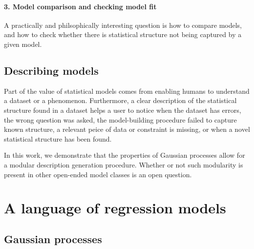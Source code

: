 \documentclass[letterpaper]{article}
\begin{document}
\paragraph{3. Model comparison and checking model fit}
A practically and philsophically interesting question is how to compare models, and how to check whether there is statistical structure not being captured by a given model. 



\subsection{Describing models}

Part of the value of statistical models comes from enabling humans to understand a dataset or a phenomenon.
Furthermore, a clear description of the statistical structure found in a dataset helps a user to notice when the dataset has errors, the wrong question was asked, the model-building procedure failed to capture known structure, a relevant peice of data or constraint is missing, or when a novel statistical structure has been found.

In this work, we 
demonstrate that the properties of Gaussian processes allow for a modular description generation procedure.
Whether or not such modularity is present in other open-ended model classes is an open question.

\section{A language of regression models}
\label{sec:improvements}

\subsection{Gaussian processes}
\end{document}
